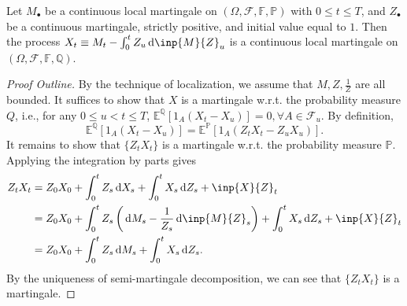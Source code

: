 \begin{theorem}[Girsanov]
Let $M_{\bullet}$ be a continuous local martingale on $(\Omega, \mathcal{F},\mathbb{F},\mathbb{P})$ with $0\le t\le T$, and $Z_{\bullet}$ be a continuous martingale, strictly positive, and initial value equal to $1$.
Then the process $X_t\equiv M_t - \int_0^tZ_u\diff\inp{M}{Z}_u$ is a continuous local martingale on $(\Omega, \mathcal{F},\mathbb{F},\mathbb{Q})$.
\end{theorem}
\begin{proof}[Proof Outline]
By the technique of localization, we assume that $M,Z,\frac{1}{Z}$ are all bounded.
It suffices to show that $X$ is a martingale w.r.t. the probability measure $Q$, i.e., for any $0\le u<t\le T$, $\mathbb{E}^{\mathbb{Q}}[1_A(X_t - X_u)]=0,\forall A\in\mathcal{F}_u$.
By definition,
\[
\mathbb{E}^{\mathbb{Q}}[1_A(X_t - X_u)]=\mathbb{E}^{\mathbb{P}}[1_A(Z_tX_t - Z_uX_u)].
\]
It remains to show that $\{Z_tX_t\}$ is a martingale w.r.t. the probability measure $\mathbb{P}$.
Applying the integration by parts gives
\begin{align*}
Z_tX_t&=Z_0X_0+\int_0^tZ_s\diff X_s + \int_0^tX_s\diff Z_s + \inp{X}{Z}_t\\
&=Z_0X_0+\int_0^tZ_s\left(\diff M_s - \frac{1}{Z_s}\diff \inp{M}{Z}_s\right) + \int_0^tX_s\diff Z_s + \inp{X}{Z}_t\\
&=Z_0X_0 + \int_0^tZ_s\diff M_s + \int_0^tX_s\diff Z_s.
\end{align*}
By the uniqueness of semi-martingale decomposition, we can see that $\{Z_tX_t\}$ is a martingale.
\end{proof}

